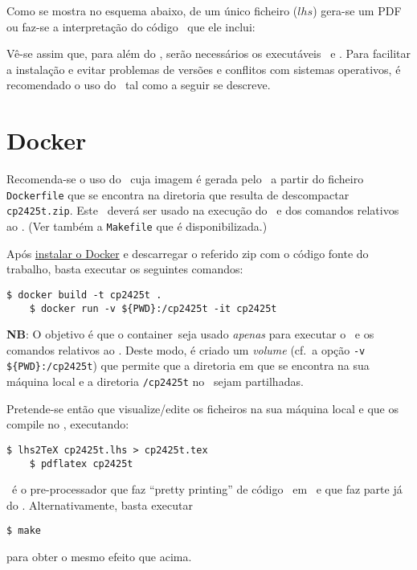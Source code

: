 \documentclass[11pt, a4paper, fleqn]{article}
\newcommand{\Varid}[1]{\mathit{#1}}
\begin{document}
Como se mostra no esquema abaixo, de um único ficheiro (\ensuremath{\Varid{lhs}})
gera-se um PDF ou faz-se a interpretação do código \Haskell\ que ele inclui:

	\esquema

Vê-se assim que, para além do \GHCi, serão necessários os executáveis \PdfLatex\ e
\LhsToTeX. Para facilitar a instalação e evitar problemas de versões e
conflitos com sistemas operativos, é recomendado o uso do \Docker\ tal como
a seguir se descreve.

\section{Docker} \label{sec:docker}

Recomenda-se o uso do \container\ cuja imagem é gerada pelo \Docker\ a partir do ficheiro
\texttt{Dockerfile} que se encontra na diretoria que resulta de descompactar
\texttt{cp2425t.zip}. Este \container\ deverá ser usado na execução
do \GHCi\ e dos comandos relativos ao \Latex. (Ver também a \texttt{Makefile}
que é disponibilizada.)

Após \href{https://docs.docker.com/engine/install/}{instalar o Docker} e
descarregar o referido zip com o código fonte do trabalho,
basta executar os seguintes comandos:
\begin{Verbatim}[fontsize=\small]
    $ docker build -t cp2425t .
    $ docker run -v ${PWD}:/cp2425t -it cp2425t
\end{Verbatim}
\textbf{NB}: O objetivo é que o container\ seja usado \emph{apenas} 
para executar o \GHCi\ e os comandos relativos ao \Latex.
Deste modo, é criado um \textit{volume} (cf.\ a opção \texttt{-v \$\{PWD\}:/cp2425t}) 
que permite que a diretoria em que se encontra na sua máquina local 
e a diretoria \texttt{/cp2425t} no \container\ sejam partilhadas.

Pretende-se então que visualize/edite os ficheiros na sua máquina local e que
os compile no \container, executando:
\begin{Verbatim}[fontsize=\small]
    $ lhs2TeX cp2425t.lhs > cp2425t.tex
    $ pdflatex cp2425t
\end{Verbatim}
\LhsToTeX\ é o pre-processador que faz ``pretty printing'' de código \Haskell\
em \Latex\ e que faz parte já do \container. Alternativamente, basta executar
\begin{Verbatim}[fontsize=\small]
    $ make
\end{Verbatim}
para obter o mesmo efeito que acima.
\end{document}
